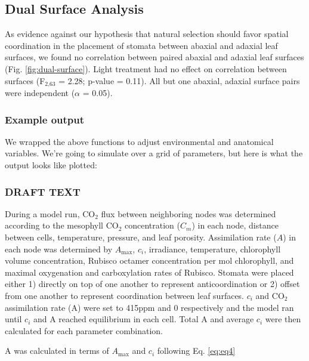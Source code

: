 \documentclass[12pt,halfline,a4paper,]{ouparticle}
\begin{document}
\hypertarget{dual-surface-analysis}{%
\subsection{Dual Surface Analysis}\label{dual-surface-analysis}}

As evidence against our hypothesis that natural selection should favor
spatial coordination in the placement of stomata between abaxial and
adaxial leaf surfaces, we found no correlation between paired abaxial
and adaxial leaf surfaces (Fig. \ref{fig:dual-surface}). Light treatment
had no effect on correlation between surfaces (F\(_\text{2,63}\) = 2.28;
p-value = 0.11). All but one abaxial, adaxial surface pairs were
independent (\(\alpha\) = 0.05).

\hypertarget{example-output}{%
\subsubsection{Example output}\label{example-output}}

We wrapped the above functions to adjust environmental and anatomical
variables. We're going to simulate over a grid of parameters, but here
is what the output looks like plotted:

\hypertarget{draft-text}{%
\subsubsection{DRAFT TEXT}\label{draft-text}}

During a model run, CO\(_2\) flux between neighboring nodes was
determined according to the mesophyll CO\(_2\) concentration (\(C_m\))
in each node, distance between cells, temperature, pressure, and leaf
porosity. Assimilation rate (\(A\)) in each node was determined by
\(A_\text{max}\), \(c_i\), irradiance, temperature, chlorophyll volume
concentration, Rubisco octamer concentration per mol chlorophyll, and
maximal oxygenation and carboxylation rates of Rubisco. Stomata were
placed either 1) directly on top of one another to represent
anticoordination or 2) offset from one another to represent coordination
between leaf surfaces. \(c_i\) and CO\(_2\) assimilation rate (A) were
set to 415ppm and 0 respectively and the model ran until \(c_i\) and A
reached equilibrium in each cell. Total A and average \(c_i\) were then
calculated for each parameter combination.

A was calculated in terms of \(A_\text{max}\) and \(c_i\) following Eq.
\ref{eq:eq4}
\end{document}
